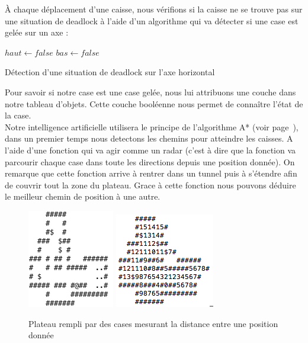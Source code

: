\documentclass[a4paper, 11pt]{report}
\begin{document}
À chaque déplacement d'une caisse, nous vérifions si la caisse ne se trouve pas sur une situation de deadlock à l'aide d'un algorithme qui va détecter si une case est gelée sur un axe :

\begin{algorithm}
$haut \gets false$\;
$bas \gets false$\;
\;
\caption{Détection d'une situation de deadlock sur l'axe horizontal}
\end{algorithm}

Pour savoir si notre case est une case gelée, nous lui attribuons une \og couche \fg{} dans notre tableau d'objets. Cette couche booléenne nous permet de connaître l'état de la case. \\

Notre intelligence artificielle utilisera le principe de l'algorithme A* (voir  page~\pageref{A*}), dans un premier temps nous detectons les chemins pour atteindre les caisses. A l'aide d'une fonction qui va agir comme un radar (c'est à dire que la fonction va parcourir chaque case dans toute les directions depuis une position donnée). On remarque que cette fonction arrive à rentrer dans un tunnel puis à s'étendre afin de couvrir tout la zone du plateau. Grace à cette fonction nous pouvons déduire le meilleur chemin de position à une autre.\\

\begin{figure}[h!]
\centering
\includegraphics{images/niveau_base}%
\includegraphics{images/chemin_radar}%
\caption{Plateau rempli par des cases mesurant la distance entre une position donnée}
\end{figure}
\end{document}
